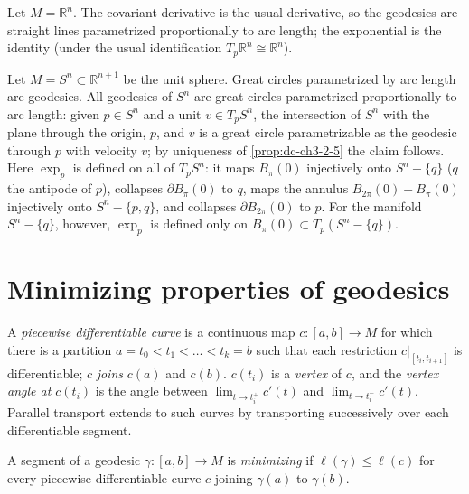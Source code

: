 \begin{example}
  \label{ex:dc-ch3-2-10}
  \notready
  Let $M=\mathbb{R}^n$. The covariant derivative is the usual derivative, so the
  geodesics are straight lines parametrized proportionally to arc length; the
  exponential is the identity (under the usual identification $T_p\mathbb{R}^n\cong\mathbb{R}^n$).
\end{example}

\begin{example}
  \label{ex:dc-ch3-2-11}
  \notready
  Let $M=S^n\subset\mathbb{R}^{n+1}$ be the unit sphere. Great circles
  parametrized by arc length are geodesics. All
  geodesics of $S^n$ are great circles parametrized proportionally to arc length:
  given $p\in S^n$ and a unit $v\in T_pS^n$, the intersection of $S^n$ with the
  plane through the origin, $p$, and $v$ is a great circle parametrizable as the
  geodesic through $p$ with velocity $v$; by uniqueness of \cref{prop:dc-ch3-2-5} the claim
  follows. Here $\exp_p$ is defined on all of $T_p S^n$: it maps $B_\pi(0)$
  injectively onto $S^n-\{q\}$ ($q$ the antipode of $p$), collapses
  $\partial B_\pi(0)$ to $q$, maps the annulus $B_{2\pi}(0)-\overline{B_\pi(0)}$
  injectively onto $S^n-\{p,q\}$, and collapses $\partial B_{2\pi}(0)$ to $p$.
  For the manifold $S^n-\{q\}$, however, $\exp_p$ is defined only on
  $B_\pi(0)\subset T_p(S^n-\{q\})$.
\end{example}

\section{Minimizing properties of geodesics}

\begin{definition}
  \label{def:dc-ch3-3-1}
  A \emph{piecewise differentiable curve} is a continuous map $c:[a,b]\to M$ for which
  there is a partition $a=t_0<t_1<\dots<t_k=b$ such that each restriction
  $c|_{[t_i,t_{i+1}]}$ is differentiable; $c$ \emph{joins} $c(a)$ and $c(b)$. $c(t_i)$ is
  a \emph{vertex} of $c$, and the \emph{vertex angle at $c(t_i)$} is the angle between
  $\lim_{t\to t_i^+}c'(t)$ and $\lim_{t\to t_i^-}c'(t)$. Parallel transport extends
  to such curves by transporting successively over each differentiable segment.
\end{definition}

\begin{definition}
  \label{def:dc-ch3-3-2}
  A segment of a geodesic $\gamma:[a,b]\to M$ is \emph{minimizing} if
  $\ell(\gamma)\le\ell(c)$ for every piecewise differentiable curve $c$ joining
  $\gamma(a)$ to $\gamma(b)$.
\end{definition}

